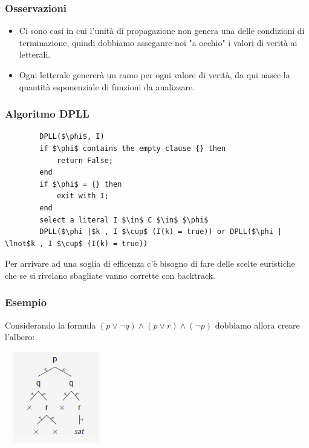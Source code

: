 \documentclass[../main.tex]{subfiles}
\begin{document}
    \subsubsection{Osservazioni}
    \begin{itemize}
        \item Ci sono casi in cui l'unità di propagazione non genera una delle condizioni di terminazione, quindi dobbiamo asseganre noi "a occhio" i valori di verità ai letterali.
        \item Ogni letterale genererà un ramo per ogni valore di verità, da qui nasce la quantità esponenziale di funzioni da analizzare.
    \end{itemize}

    \subsubsection{Algoritmo DPLL}
    \begin{lstlisting}
        DPLL($\phi$, I)
        if $\phi$ contains the empty clause {} then
            return False;
        end
        if $\phi$ = {} then
            exit with I;
        end
        select a literal I $\in$ C $\in$ $\phi$
        DPLL($\phi |$k , I $\cup$ (I(k) = true)) or DPLL($\phi | \lnot$k , I $\cup$ (I(k) = true))
    \end{lstlisting}
    Per arrivare ad una soglia di efficenza c'è bisogno di fare delle scelte euristiche che se si rivelano sbagliate vanno corrette con backtrack.
    \subsubsection{Esempio}
    Considerando la formula $(p \lor \lnot q) \land (p \lor r) \land (\lnot p)$ dobbiamo allora creare l'albero:
    \begin{center}
        \includegraphics[width=4.5cm,height=4cm,angle=0]{../img/albero_DPLL.png}
    \end{center}
\end{document}
